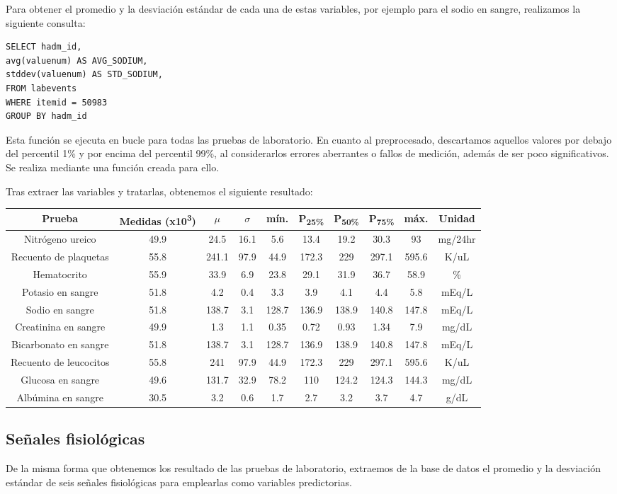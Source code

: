 \documentclass{report}
\begin{document}
Para obtener el promedio y la desviación estándar de cada una de estas
variables, por ejemplo para el sodio en sangre, realizamos la siguiente
consulta:

\begin{verbatim}
SELECT hadm_id,
avg(valuenum) AS AVG_SODIUM,
stddev(valuenum) AS STD_SODIUM,
FROM labevents
WHERE itemid = 50983
GROUP BY hadm_id
\end{verbatim}
Esta función se ejecuta en bucle para todas las pruebas de laboratorio.
En cuanto al preprocesado, descartamos aquellos valores por debajo del
percentil 1\% y por encima del percentil 99\%, al considerarlos errores
aberrantes o fallos de medición, además de ser poco significativos. Se
realiza mediante una función creada para ello.

Tras extraer las variables y tratarlas, obtenemos el siguiente
resultado:



\begin{longtable}[]{@{}cccccccccc@{}}
\toprule
Prueba  & Medidas (x10\textsuperscript{3}) & $\mu$ &
$\sigma$ & mín. &  P\textsubscript{25\%} & 
 P\textsubscript{50\%} &   P\textsubscript{75\%} & máx. & Unidad \tabularnewline
\midrule
\endhead
Nitrógeno ureico & 49.9 & 24.5 & 16.1 & 5.6 & 13.4 & 19.2 &
30.3 & 93 & mg/24hr\tabularnewline
Recuento de plaquetas & 55.8 & 241.1 & 97.9 & 44.9 & 172.3 & 229 & 297.1
& 595.6 & K/uL\tabularnewline
Hematocrito & 55.9 & 33.9 & 6.9 & 23.8 & 29.1 & 31.9 & 36.7 & 58.9 &
\%\tabularnewline
Potasio en sangre & 51.8 & 4.2 & 0.4 & 3.3 & 3.9 & 4.1 & 4.4 & 5.8 &
mEq/L\tabularnewline
Sodio en sangre & 51.8 & 138.7 & 3.1 & 128.7 & 136.9 & 138.9 & 140.8 &
147.8 & mEq/L\tabularnewline
Creatinina en sangre & 49.9 & 1.3 & 1.1 & 0.35 & 0.72 & 0.93 & 1.34 &
7.9 & mg/dL\tabularnewline
Bicarbonato en sangre & 51.8 & 138.7 & 3.1 & 128.7 & 136.9 & 138.9 &
140.8 & 147.8 & mEq/L\tabularnewline
Recuento de leucocitos & 55.8 & 241 & 97.9 & 44.9 & 172.3 & 229 & 297.1
& 595.6 & K/uL\tabularnewline
Glucosa en sangre & 49.6 & 131.7 & 32.9 & 78.2 & 110 & 124.2 & 124.3 &
144.3 & mg/dL\tabularnewline
Albúmina en sangre & 30.5 & 3.2 & 0.6 & 1.7 & 2.7 & 3.2 & 3.7 & 4.7 &
g/dL\tabularnewline
\bottomrule
\end{longtable}
\newpage
\subsection{Señales fisiológicas}

De la misma forma que obtenemos los resultado de las pruebas de
laboratorio, extraemos de la base de datos el promedio y la desviación
estándar de seis señales fisiológicas para emplearlas como variables
predictorias.
\end{document}
